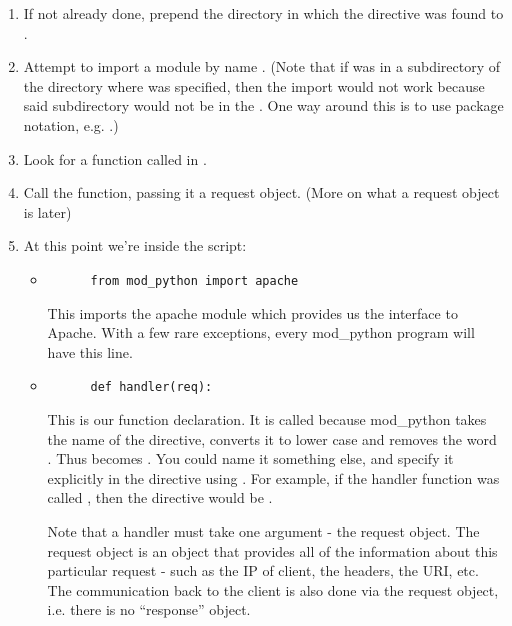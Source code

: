 \begin{enumerate}

\item
  If not already done, prepend the directory in which the
   directive was found to .

\item
  Attempt to import a module by name . (Note that if
   was in a subdirectory of the directory where
   was specified, then the import would not work
  because said subdirectory would not be in the . One
  way around this is to use package notation, e.g. .)

\item 
  Look for a function called  in .

\item
  Call the function, passing it a request object. (More on what a
  request object is later)

\item
  At this point we're inside the script: 

  \begin{itemize}

  \item
    \begin{verbatim}
      from mod_python import apache
    \end{verbatim}

    This imports the apache module which provides us the interface to
    Apache. With a few rare exceptions, every mod_python program will have
    this line.

  \item
    \begin{verbatim}
      def handler(req):
    \end{verbatim}

     This is our  function declaration. It
    is called  because mod_python takes the name of the
    directive, converts it to lower case and removes the word
    . Thus  becomes
    . You could name it something else, and specify it
    explicitly in the directive using \samp{::}. For example, if the
    handler function was called , then the directive would
    be .

    Note that a handler must take one argument - the request
    object. The request object is an object that provides all of the
    information about this particular request - such as the IP of
    client, the headers, the URI, etc. The communication back to the
    client is also done via the request object, i.e. there is no
    ``response'' object.


\end{itemize}
\end{enumerate}
